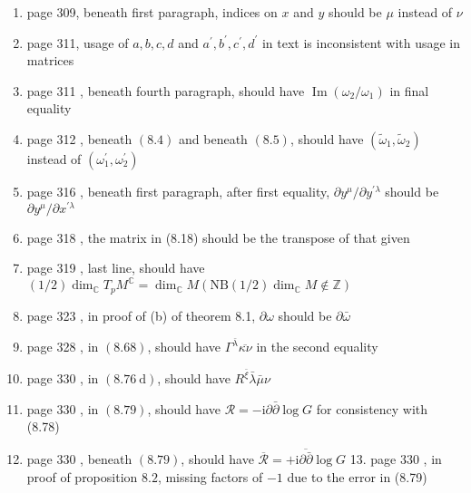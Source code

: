 \documentclass{article}
\begin{document}
\begin{enumerate}
  
\item page 309, beneath first paragraph, indices on $x$ and $y$ should be $\mu$ instead of $\nu$

\item page 311, usage of $a, b, c, d$ and $a^{\prime}, b^{\prime}, c^{\prime}, d^{\prime}$ in text is inconsistent with usage in matrices

\item page 311 , beneath fourth paragraph, should have $\operatorname{Im}\left(\omega_{2} / \omega_{1}\right)$ in final equality

\item page 312 , beneath $(8.4)$ and beneath $(8.5)$, should have $\left(\tilde{\omega}_{1}, \tilde{\omega}_{2}\right)$ instead of $\left(\omega_{1}^{\prime}, \omega_{2}^{\prime}\right)$

\item page 316 , beneath first paragraph, after first equality, $\partial y^{\mu} / \partial y^{\prime \lambda}$ should be $\partial y^{\mu} / \partial x^{\prime \lambda}$

\item page 318 , the matrix in (8.18) should be the transpose of that given

\item page 319 , last line, should have $(1 / 2) \operatorname{dim}_{\mathbb{C}} T_{p} M^{\mathbb{C}}=\operatorname{dim}_{\mathbb{C}} M\left(\mathrm{NB}(1 / 2) \operatorname{dim}_{\mathbb{C}} M \notin \mathbb{Z}\right)$

\item page 323 , in proof of (b) of theorem 8.1, $\partial \omega$ should be $\partial \bar{\omega}$

\item page 328 , in $(8.68)$, should have $\Gamma^{\bar{\lambda}} \overline{\kappa \nu}$ in the second equality

\item page 330 , in $(8.76 \mathrm{~d})$, should have $R^{\bar{\xi}} \bar{\lambda} \bar{\mu} \nu$

\item page 330 , in $(8.79)$, should have $\mathcal{R}=-\mathrm{i} \partial \bar{\partial} \log G$ for consistency with (8.78)

\item page 330 , beneath $(8.79)$, should have $\overline{\mathcal{R}}=+\mathrm{i} \overline{\partial \bar{\partial}} \log G$ 13. page 330 , in proof of proposition $8.2$, missing factors of $-1$ due to the error in (8.79)


\end{enumerate}
\end{document}
